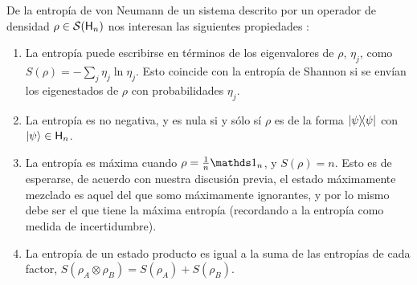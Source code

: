 
De la entropía de von Neumann de un sistema descrito por un operador de densidad $\rho\in\mathcal{S}({\sf H}_{n})$ nos interesan las siguientes propiedades \cite{Chuang}:
\begin{enumerate}
    \item La entropía puede escribirse en términos de los eigenvalores de $\rho$, $\eta_{j}$, como $S(\rho)=-\sum_{j}\eta_{j}\ln{\eta_{j}}$. Esto coincide con la entropía de Shannon si se envían los eigenestados de $\rho$ con probabilidades $\eta_{j}$.
    \item La entropía es no negativa, y es nula si y sólo sí $\rho$ es de la forma $\dyad{\psi}$ con $\ket{\psi}\in{\sf H}_{n}$.
    \item La entropía es máxima cuando $\rho=\frac{1}{n}\Id_{n}$, y $S(\rho)=n$. Esto es de esperarse, de acuerdo con nuestra discusión previa, el estado máximamente mezclado es aquel del que somo máximamente ignorantes, y por lo mismo debe ser el que tiene la máxima entropía (recordando a la entropía como medida de incertidumbre).
    \item La entropía de un estado producto es igual a la suma de las entropías de cada factor, $S(\rho_{A}\otimes\rho_{B})=S(\rho_{A})+S(\rho_{B})$.
\end{enumerate}